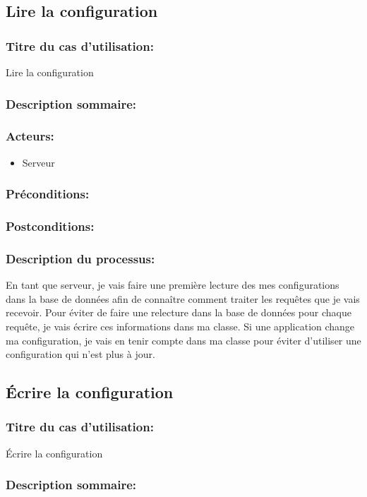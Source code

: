 \documentclass{scrreprt}
\begin{document}
\subsection{Lire la configuration}
\subsubsection{Titre du cas d'utilisation:} Lire la configuration
\subsubsection{Description sommaire:}
\subsubsection{Acteurs:}
\begin{itemize}
    \item Serveur
\end{itemize}
\subsubsection{Préconditions:}
\subsubsection{Postconditions:}
\subsubsection{Description du processus:}En tant que serveur, je vais faire une première lecture des mes configurations dans la base de données afin de connaître comment traiter les requêtes que je vais recevoir.
Pour éviter de faire une relecture dans la base de données pour chaque requête,
je vais écrire ces informations dans ma classe.
Si une application change ma configuration, je vais en tenir compte dans ma
classe pour éviter d'utiliser une configuration qui n'est plus à jour.

\subsection{Écrire la configuration}
\subsubsection{Titre du cas d'utilisation:} Écrire la configuration
\subsubsection{Description sommaire:}
\end{document}
